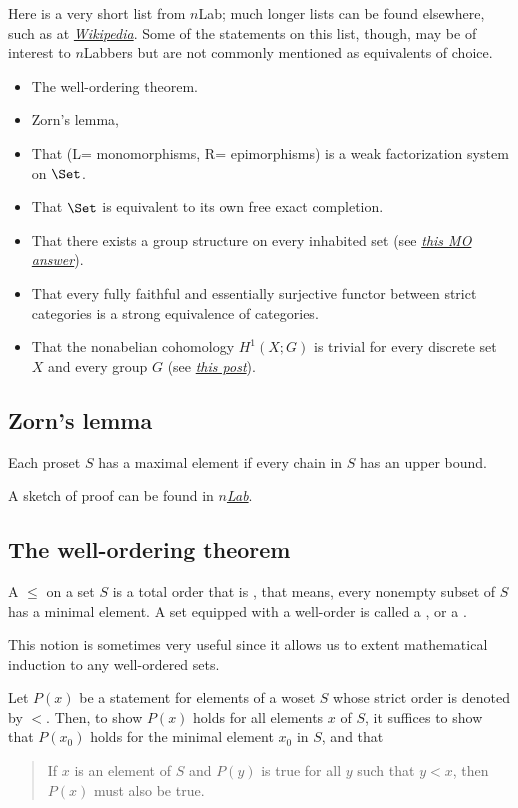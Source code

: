   Here is a very short list from $n$Lab; much longer lists can be found elsewhere, such as at \emph{\href{http://en.wikipedia.org/wiki/Axiom_of_choice\#Equivalents}{Wikipedia}}. Some of the statements on this list, though, may be of interest to $n$Labbers but are not commonly mentioned as equivalents of choice.
  \begin{itemize}
    \item The well-ordering theorem.
    \item Zorn's lemma,
    \item That (L= monomorphisms, R= epimorphisms) is a weak factorization system on $\Set$.
    \item That $\Set$ is equivalent to its own free exact completion.
    \item That there exists a group structure on every inhabited set (see \emph{\href{http://mathoverflow.net/questions/12973/does-every-non-empty-set-admit-a-group-structure-in-zf/12988\#12988}{this MO answer}}).
    \item That every fully faithful and essentially surjective functor between strict categories is a strong equivalence of categories.
    \item That the nonabelian cohomology $H^1(X;G)$ is trivial for every discrete set $X$ and every group $G$ (see \emph{\href{http://golem.ph.utexas.edu/category/2013/07/cohomology_detects_failures_of.html}{this post}}).
  \end{itemize}
\subsection{Zorn's lemma}
  \begin{thm}
    Each proset $S$ has a maximal element if every chain in $S$ has an upper bound.
  \end{thm}
  A sketch of proof can be found in \emph{\href{http://ncatlab.org/nlab/show/Zorn's+lemma}{$n$Lab}}.
\subsection{The well-ordering theorem}
  \begin{defn}
    A  $\leqslant$ on a set $S$ is a total order that is , that means, every nonempty subset of $S$ has a minimal element.
    A set equipped with a well-order is called a , or a .
  \end{defn}
  This notion is sometimes very useful since it allows us to extent mathematical induction to any well-ordered sets.
  \begin{prop}
    Let $P(x)$ be a statement for elements of a woset $S$ whose strict order is denoted by $<$. Then, to show $P(x)$ holds for all elements $x$ of $S$, it suffices to show that $P(x_0)$ holds for the minimal element $x_0$ in $S$, and that
    \begin{quote}
      If $x$ is an element of $S$ and $P(y)$ is true for all $y$ such that $y<x$, then $P(x)$ must also be true.
    \end{quote}
  \end{prop}

